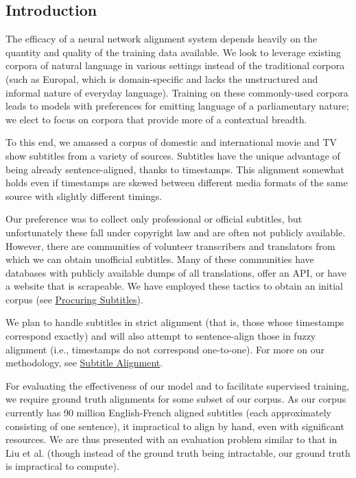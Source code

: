 \documentclass[twoside,twocolumn]{article}
\begin{document}
\subsection{Introduction}

The efficacy of a neural network alignment system depends heavily on the
quantity and quality of the training data available. We look to leverage
existing corpora of natural language in various settings instead of the
traditional corpora (such as Europal, which is domain-specific and lacks the
unstructured and informal nature of everyday language). Training on these
commonly-used corpora leads to models with preferences for emitting language
of a parliamentary nature; we elect to focus on corpora that
provide more of a contextual breadth.

To this end, we amassed a corpus of domestic and international movie and TV
show subtitles from a variety of sources. Subtitles have the unique advantage
of being already sentence-aligned, thanks to timestamps. This alignment
somewhat holds even if timestamps are skewed between different media
formats of the same source with slightly different timings.

Our preference was to collect only professional or official subtitles, but
unfortunately these fall under copyright law and are often not publicly
available. However, there are communities of volunteer transcribers and
translators from which we can obtain unofficial subtitles. Many of these
communities have databases with publicly available dumps of all translations,
offer an API, or have a website that is scrapeable. We have employed these
tactics to obtain an initial corpus (see
\hyperref[subsec:procuring-subtitles]{Procuring Subtitles}).

We plan to handle subtitles in strict alignment (that is, those whose timestamps
correspond exactly) and will also attempt to sentence-align those in
fuzzy alignment (i.e., timestamps do not correspond one-to-one). For more on our
methodology, see \hyperref[subsec:subtitle-alignment]{Subtitle Alignment}.

For evaluating the effectiveness of our model and to facilitate
supervised training, we require ground truth alignments for some subset of our corpus. As our corpus currently has 90 million English-French aligned subtitles
(each approximately consisting of one sentence), it impractical to align by hand,
even with significant resources.
We are thus presented with an evaluation problem similar to that in Liu et al.
\cite{liu2015streaming} (though instead of the ground truth being intractable,
our ground truth is impractical to compute).
\end{document}
